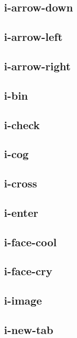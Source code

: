 \subsection{i-arrow-down}

\subsection{i-arrow-left}

\subsection{i-arrow-right}

\subsection{i-bin}


\subsection{i-check}

\subsection{i-cog}


\subsection{i-cross}

\subsection{i-enter}

\subsection{i-face-cool}

\subsection{i-face-cry}


\subsection{i-image}


\subsection{i-new-tab}


